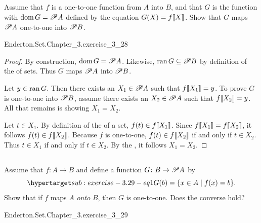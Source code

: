 \documentclass{report}
\begin{document}
\subsection{}%

  Assume that $f$ is a one-to-one function from $A$ into $B$, and that $G$ is
    the function with $\mathop{\text{dom}}{G} = \mathscr{P}A$ defined by the equation
    $G(X) = f\!\left\llbracket X\right\rrbracket$.
  Show that $G$ maps $\mathscr{P}A$ one-to-one into $\mathscr{P}B$.

    {Enderton.Set.Chapter\_3.exercise\_3\_28}

  \begin{proof}
    By construction, $\mathop{\text{dom}}{G} = \mathscr{P}A$.
    Likewise, $\mathop{\text{ran}}{G} \subseteq \mathscr{P}B$ by definition of the
       of sets.
    Thus $G$ maps $\mathscr{P}A$ into $\mathscr{P}B$.

    Let $y \in \mathop{\text{ran}}{G}$.
    Then there exists an $X_1 \in \mathscr{P}A$ such that $f\!\left\llbracket X_1\right\rrbracket = y$.
    To prove $G$ is one-to-one into $\mathscr{P}B$, assume there exists an
      $X_2 \in \mathscr{P}A$ such that $f\!\left\llbracket X_2\right\rrbracket = y$.
    All that remains is showing $X_1 = X_2$.

    Let $t \in X_1$.
    By definition of the  of a set, $f(t) \in f\!\left\llbracket X_1\right\rrbracket$.
    Since $f\!\left\llbracket X_1\right\rrbracket = f\!\left\llbracket X_2\right\rrbracket$, it follows $f(t) \in f\!\left\llbracket X_2\right\rrbracket$.
    Because $f$ is one-to-one, $f(t) \in f\!\left\llbracket X_2\right\rrbracket$ if and only if
      $t \in X_2$.
    Thus $t \in X_1$ if and only if $t \in X_2$.
    By the , it follows $X_1 = X_2$.
  \end{proof}

\subsection{}%

  Assume that $f \colon A \rightarrow B$ and define a function
    $G \colon B \rightarrow \mathscr{P}A$ by
    \begin{equation}
      \hyperlabel{sub:exercise-3.29-eq1}
      G(b) = \{x \in A \mid f(x) = b\}.
    \end{equation}
  Show that if $f$ maps $A$ \textit{onto} $B$, then $G$ is one-to-one.
  Does the converse hold?

    {Enderton.Set.Chapter\_3.exercise\_3\_29}
\end{document}
